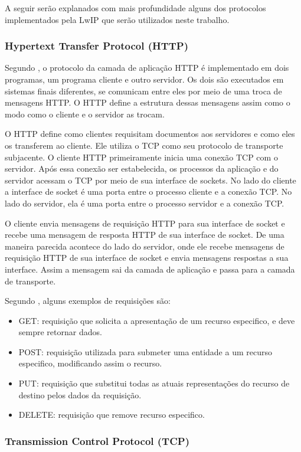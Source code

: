 A seguir serão explanados com mais profundidade alguns dos protocolos implementados pela LwIP que serão utilizados neste trabalho.

\subsubsection{Hypertext Transfer Protocol (HTTP)}
Segundo , o protocolo da camada de aplicação HTTP é implementado em dois programas, um programa cliente e outro servidor. Os dois são executados em sistemas finais diferentes, se comunicam entre eles por meio de uma troca de mensagens HTTP. O HTTP define a estrutura dessas mensagens assim como o modo como o cliente e o servidor as trocam. 

O HTTP define como clientes requisitam documentos aos servidores e como eles os transferem ao cliente. Ele utiliza o TCP como seu protocolo de transporte subjacente. O cliente HTTP primeiramente inicia uma conexão TCP com o servidor. Após essa conexão ser estabelecida, os processos da aplicação e do servidor acessam o TCP por meio de sua interface de sockets. No lado do cliente a interface de socket é uma porta entre o processo cliente e a conexão TCP. No lado do servidor, ela é uma porta entre o processo servidor  e a conexão TCP.

O cliente envia mensagens de requisição HTTP para sua interface de socket e recebe uma mensagem de resposta HTTP de sua interface de socket. De uma maneira parecida acontece do lado do servidor, onde ele recebe mensagens de requisição HTTP de sua interface de socket e envia mensagens respostas a sua interface. Assim a mensagem sai da camada de aplicação e passa para a camada de transporte. 

Segundo , alguns exemplos de requisições são:
\begin{itemize}
    \item GET: requisição que solicita a apresentação de um recurso especifico, e deve sempre retornar dados.
    \item POST: requisição utilizada para submeter uma entidade a um recurso especifico, modificando assim o recurso.
    \item PUT: requisição que substitui todas as atuais representações do recurso de destino pelos dados da requisição.
    \item DELETE: requisição que remove recurso especifico.
\end{itemize} 

\subsubsection{Transmission Control Protocol (TCP)}

